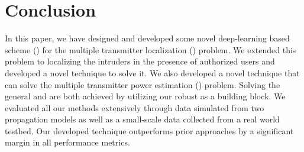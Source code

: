 \section{Conclusion}

In this paper, we have designed and developed some novel deep-learning based scheme (\our) for
the multiple transmitter localization (\mtl) problem.
We extended this problem to localizing the intruders in the presence of authorized users and developed a novel technique to solve it. 
We also developed a novel technique that can solve the multiple transmitter power estimation (\mtpe) problem.
Solving the general \mtl and \mtpe are both achieved by utilizing our robust \our as a building block. 
We evaluated all our methods extensively through data simulated from two propagation models as well as a small-scale data collected from a real world testbed. 
Our developed technique outperforms prior approaches by a significant margin in all performance metrics.


